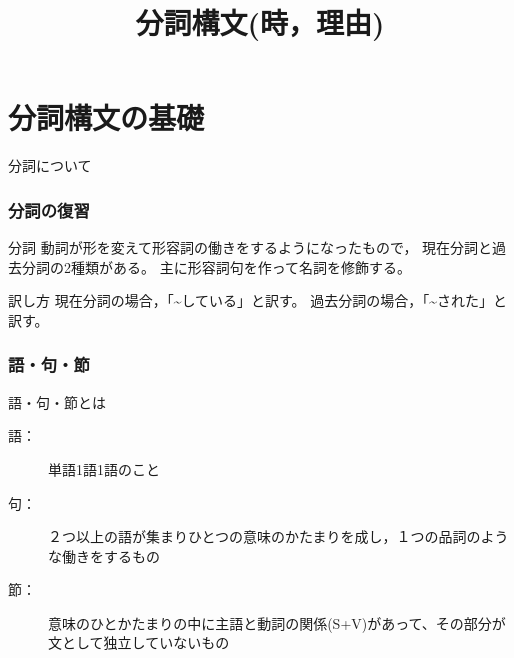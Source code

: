 \documentclass[xcolor=dvipsnames,unicode,14pt]{beamer}%
\title{分詞構文(時，理由)}
\begin{document}
\frame{\maketitle}

\begin{frame}
  \tableofcontents
\end{frame}
\section{分詞構文の基礎}
\begin{frame}
  \centering
  \LARGE 分詞について

\end{frame}
\begin{frame}
  \frametitle{分詞の復習}
  \begin{block}{分詞}
    動詞が形を変えて形容詞の働きをするようになったもので，
    現在分詞と過去分詞の2種類がある。
    主に形容詞句を作って名詞を修飾する。
  \end{block}
  \begin{block}{訳し方}
    現在分詞の場合，「\textasciitilde している」と訳す。
    過去分詞の場合，「\textasciitilde された」と訳す。
  \end{block}
\end{frame}

\begin{frame}
  \frametitle{語・句・節}
  語・句・節とは
  \pause
  \begin{description}
    \item[語：] 単語1語1語のこと
    \item[句：] ２つ以上の語が集まりひとつの意味のかたまりを成し，１つの品詞のような働きをするもの
    \item[節：] 意味のひとかたまりの中に主語と動詞の関係(S+V)があって、その部分が文として独立していないもの
  \end{description}
  \pause

\end{frame}
\end{document}
